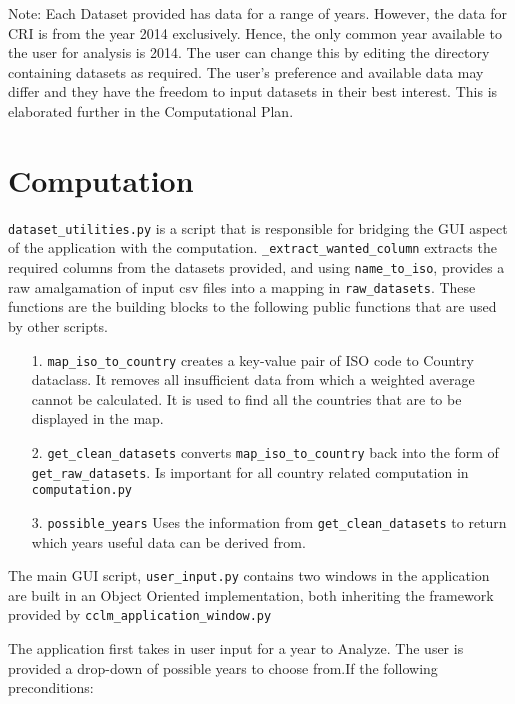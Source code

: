 \documentclass[fontsize=11pt]{article}
\begin{document}
    Note: Each Dataset provided has data for a range of years. However, the data for CRI is from the year 2014 exclusively. Hence, the only common year available to the user for analysis is 2014. The user can change this by editing the directory containing datasets as required. The user’s preference and available data may differ and they have the freedom to input datasets in their best interest. This is elaborated further in the Computational Plan.


    \section*{Computation}
    
    \texttt{dataset\_utilities.py} is a script that is responsible for bridging the GUI aspect of the application with the computation. \texttt{\_extract\_wanted\_column} extracts the required columns from the datasets provided, and using \texttt{name\_to\_iso}, provides a raw amalgamation of input csv files into a mapping in \texttt{raw\_datasets}. These functions are the building blocks to the following public functions that are used by other scripts.
    
    \begin{enumerate}
    	\item [1.] \texttt{map\_iso\_to\_country} creates a key-value pair of ISO code to Country dataclass. It removes all insufficient data from which a weighted average cannot be calculated. It is used to find all the countries that are to be displayed in the map.
    	
    	\item[2.] \texttt{get\_clean\_datasets} converts \texttt{map\_iso\_to\_country} back into the form of \texttt{get\_raw\_datasets}. Is important for all country related computation in \texttt{computation.py}
    	
    	\item[3.] \texttt{possible\_years} Uses the information from \texttt{get\_clean\_datasets} to return which years useful data can be derived from.
    \end{enumerate}

	The main GUI script, \texttt{user\_input.py} contains two windows in the application are built in an Object Oriented implementation, both inheriting the framework provided by \texttt{cclm\_application\_window.py}\newline

    The application first takes in user input for a year to Analyze. The user is provided a drop-down of
    possible years to choose from.\newline If the following preconditions:
\end{document}
